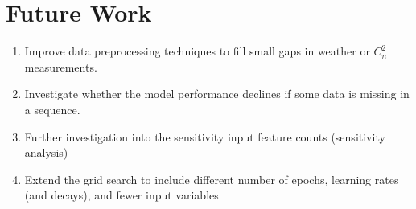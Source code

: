 \chapter{Future Work}
\label{ch6}

\begin{enumerate}
	\item Improve data preprocessing techniques to fill small gaps in weather or $C_{n}^{2}$ measurements.
	\item Investigate whether the model performance declines if some data is missing in a sequence.
	\item Further investigation into the sensitivity input feature counts (sensitivity analysis)
	\item Extend the grid search to include different number of epochs, learning rates (and decays), and fewer input variables
\end{enumerate}